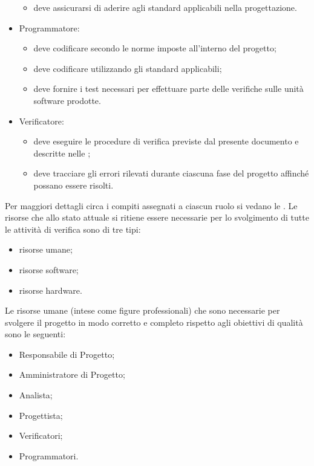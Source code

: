 \begin{itemize}
\begin{itemize}
					\item deve assicurarsi di aderire agli standard applicabili nella progettazione.
				\end{itemize}
				\item Programmatore:
				\begin{itemize}
					\item deve codificare secondo le norme imposte all'interno del progetto;
					\item deve codificare utilizzando gli standard applicabili;
					\item deve fornire i test necessari per effettuare parte delle verifiche sulle unità software prodotte.
				\end{itemize}
				\item Verificatore:
				\begin{itemize}
					\item deve eseguire le procedure di verifica previste dal presente documento e descritte nelle ;
					\item deve tracciare gli errori rilevati durante ciascuna fase del progetto affinché possano essere risolti.
				\end{itemize}
			\end{itemize}
			Per maggiori dettagli circa i compiti assegnati a ciascun ruolo si vedano le .
				Le risorse che allo stato attuale si ritiene essere necessarie per lo svolgimento di tutte le attività di verifica 
				sono di tre tipi:
				\begin{itemize}
					\item risorse umane;
					\item risorse software;
					\item risorse hardware.
				\end{itemize}
					Le risorse umane (intese come figure professionali) che sono necessarie per svolgere il progetto in modo corretto e completo 
					rispetto agli obiettivi di qualità sono le seguenti:
					\begin{itemize}
						\item Responsabile di Progetto;
						\item Amministratore di Progetto;
						\item Analista;
						\item Progettista;
						\item Verificatori;
						\item Programmatori.
					\end{itemize}
